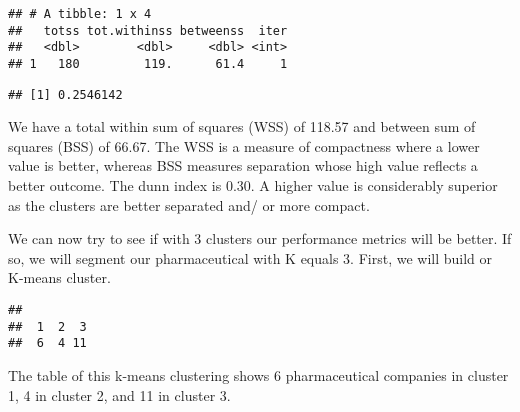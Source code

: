 \documentclass[]{article}
\newenvironment{Shaded}{\begin{snugshade}}{\end{snugshade}}
\newcommand{\KeywordTok}[1]{\textcolor[rgb]{0.13,0.29,0.53}{\textbf{#1}}}
\newcommand{\DataTypeTok}[1]{\textcolor[rgb]{0.13,0.29,0.53}{#1}}
\newcommand{\DecValTok}[1]{\textcolor[rgb]{0.00,0.00,0.81}{#1}}
\newcommand{\StringTok}[1]{\textcolor[rgb]{0.31,0.60,0.02}{#1}}
\newcommand{\CommentTok}[1]{\textcolor[rgb]{0.56,0.35,0.01}{\textit{#1}}}
\newcommand{\OperatorTok}[1]{\textcolor[rgb]{0.81,0.36,0.00}{\textbf{#1}}}
\newcommand{\NormalTok}[1]{#1}
\begin{document}
\begin{verbatim}
## # A tibble: 1 x 4
##   totss tot.withinss betweenss  iter
##   <dbl>        <dbl>     <dbl> <int>
## 1   180         119.      61.4     1
\end{verbatim}

\begin{Shaded}
\end{Shaded}

\begin{verbatim}
## [1] 0.2546142
\end{verbatim}

We have a total within sum of squares (WSS) of 118.57 and between sum of
squares (BSS) of 66.67. The WSS is a measure of compactness where a
lower value is better, whereas BSS measures separation whose high value
reflects a better outcome. The dunn index is 0.30. A higher value is
considerably superior as the clusters are better separated and/ or more
compact.

We can now try to see if with 3 clusters our performance metrics will be
better. If so, we will segment our pharmaceutical with K equals 3.
First, we will build or K-means cluster.

\begin{Shaded}
\end{Shaded}

\begin{verbatim}
## 
##  1  2  3 
##  6  4 11
\end{verbatim}

The table of this k-means clustering shows 6 pharmaceutical companies in
cluster 1, 4 in cluster 2, and 11 in cluster 3.
\end{document}
